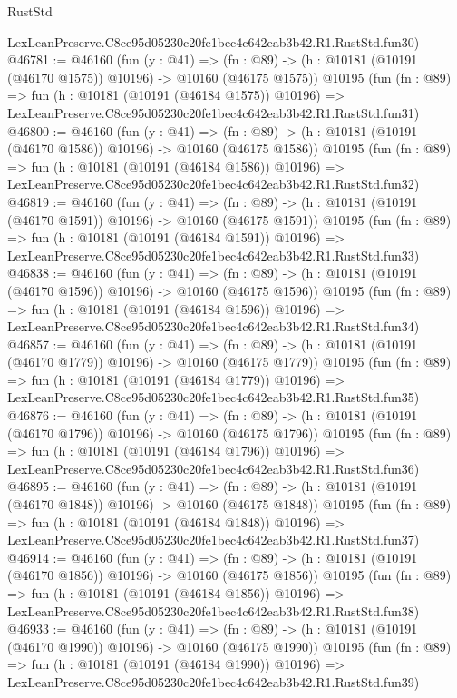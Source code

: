 \begin{lexlean}{RustStd}
\begin{coremodule}
    LexLeanPreserve.C8ce95d05230c20fe1bec4c642eab3b42.R1.RustStd.fun30)
@46781 := @46160
    (fun (y : @41) =>
    (fn : @89) -> (h : @10181 (@10191 (@46170 @1575)) @10196) -> @10160 (@46175 @1575))
    @10195
    (fun (fn : @89) =>
    fun (h : @10181 (@10191 (@46184 @1575)) @10196) =>
    LexLeanPreserve.C8ce95d05230c20fe1bec4c642eab3b42.R1.RustStd.fun31)
@46800 := @46160
    (fun (y : @41) =>
    (fn : @89) -> (h : @10181 (@10191 (@46170 @1586)) @10196) -> @10160 (@46175 @1586))
    @10195
    (fun (fn : @89) =>
    fun (h : @10181 (@10191 (@46184 @1586)) @10196) =>
    LexLeanPreserve.C8ce95d05230c20fe1bec4c642eab3b42.R1.RustStd.fun32)
@46819 := @46160
    (fun (y : @41) =>
    (fn : @89) -> (h : @10181 (@10191 (@46170 @1591)) @10196) -> @10160 (@46175 @1591))
    @10195
    (fun (fn : @89) =>
    fun (h : @10181 (@10191 (@46184 @1591)) @10196) =>
    LexLeanPreserve.C8ce95d05230c20fe1bec4c642eab3b42.R1.RustStd.fun33)
@46838 := @46160
    (fun (y : @41) =>
    (fn : @89) -> (h : @10181 (@10191 (@46170 @1596)) @10196) -> @10160 (@46175 @1596))
    @10195
    (fun (fn : @89) =>
    fun (h : @10181 (@10191 (@46184 @1596)) @10196) =>
    LexLeanPreserve.C8ce95d05230c20fe1bec4c642eab3b42.R1.RustStd.fun34)
@46857 := @46160
    (fun (y : @41) =>
    (fn : @89) -> (h : @10181 (@10191 (@46170 @1779)) @10196) -> @10160 (@46175 @1779))
    @10195
    (fun (fn : @89) =>
    fun (h : @10181 (@10191 (@46184 @1779)) @10196) =>
    LexLeanPreserve.C8ce95d05230c20fe1bec4c642eab3b42.R1.RustStd.fun35)
@46876 := @46160
    (fun (y : @41) =>
    (fn : @89) -> (h : @10181 (@10191 (@46170 @1796)) @10196) -> @10160 (@46175 @1796))
    @10195
    (fun (fn : @89) =>
    fun (h : @10181 (@10191 (@46184 @1796)) @10196) =>
    LexLeanPreserve.C8ce95d05230c20fe1bec4c642eab3b42.R1.RustStd.fun36)
@46895 := @46160
    (fun (y : @41) =>
    (fn : @89) -> (h : @10181 (@10191 (@46170 @1848)) @10196) -> @10160 (@46175 @1848))
    @10195
    (fun (fn : @89) =>
    fun (h : @10181 (@10191 (@46184 @1848)) @10196) =>
    LexLeanPreserve.C8ce95d05230c20fe1bec4c642eab3b42.R1.RustStd.fun37)
@46914 := @46160
    (fun (y : @41) =>
    (fn : @89) -> (h : @10181 (@10191 (@46170 @1856)) @10196) -> @10160 (@46175 @1856))
    @10195
    (fun (fn : @89) =>
    fun (h : @10181 (@10191 (@46184 @1856)) @10196) =>
    LexLeanPreserve.C8ce95d05230c20fe1bec4c642eab3b42.R1.RustStd.fun38)
@46933 := @46160
    (fun (y : @41) =>
    (fn : @89) -> (h : @10181 (@10191 (@46170 @1990)) @10196) -> @10160 (@46175 @1990))
    @10195
    (fun (fn : @89) =>
    fun (h : @10181 (@10191 (@46184 @1990)) @10196) =>
    LexLeanPreserve.C8ce95d05230c20fe1bec4c642eab3b42.R1.RustStd.fun39)

\end{coremodule}
\end{lexlean}
